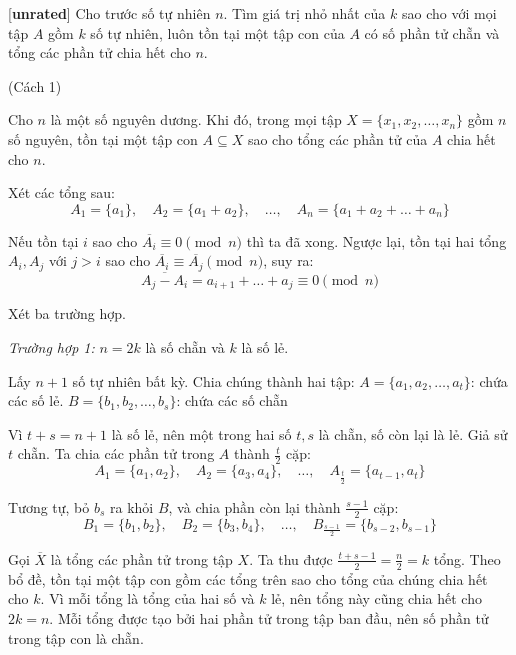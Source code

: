 \documentclass[../09-contruction-methods.tex]{subfiles}
\begin{document}
\begin{example*}\label{example:IRN-2015-TST-D2-P1}[\textbf{unrated}]
	Cho trước số tự nhiên \( n \). Tìm giá trị nhỏ nhất của \( k \) sao cho với mọi tập \( A \) gồm \( k \) số tự nhiên,
	luôn tồn tại một tập con của \( A \) có số phần tử chẵn và tổng các phần tử chia hết cho \( n \).
\end{example*}

\begin{soln}(Cách 1)\footnotemark
	\begin{claim*}
		Cho \( n \) là một số nguyên dương. Khi đó, trong mọi tập \( X = \{x_1, x_2, \dots, x_n\} \) gồm \( n \) số nguyên,
		tồn tại một tập con \( A \subseteq X \) sao cho tổng các phần tử của \( A \) chia hết cho \( n \).
	\end{claim*}
	\begin{subproof}
		Xét các tổng sau:
		\[
			A_1 = \{a_1\},\quad A_2 = \{a_1 + a_2\},\quad \dots,\quad A_n = \{a_1 + a_2 + \dots + a_n\}
		\]
		
		Nếu tồn tại \( i \) sao cho \( \overline{A_i} \equiv 0 \pmod{n} \) thì ta đã xong.
		Ngược lại, tồn tại hai tổng \( A_i, A_j \) với \( j > i \) sao cho \( \overline{A_i} \equiv \overline{A_j} \pmod{n} \), suy ra:
		\[
			\overline{A_j - A_i} = a_{i+1} + \dots + a_j \equiv 0 \pmod{n}
		\]
	\end{subproof}
	
	Xét ba trường hợp.

	\textit{Trường hợp 1:} \( n = 2k \) là số chẵn và \( k \) là số lẻ.

	Lấy \( n+1 \) số tự nhiên bất kỳ. Chia chúng thành hai tập: \( A = \{a_1, a_2, \dots, a_t\} \): chứa các số lẻ. \( B = \{b_1, b_2, \dots, b_s\} \): chứa các số chẵn
	
	Vì \( t + s = n + 1 \) là số lẻ, nên một trong hai số \( t, s \) là chẵn, số còn lại là lẻ. Giả sử \( t \) chẵn.
	Ta chia các phần tử trong \( A \) thành \( \frac{t}{2} \) cặp:
	\[
		A_1 = \{a_1, a_2\},\quad A_2 = \{a_3, a_4\},\quad \dots,\quad A_{\frac{t}{2}} = \{a_{t-1}, a_t\}
	\]
	
	Tương tự, bỏ \( b_s \) ra khỏi \( B \), và chia phần còn lại thành \( \frac{s - 1}{2} \) cặp:
	\[
		B_1 = \{b_1, b_2\},\quad B_2 = \{b_3, b_4\},\quad \dots,\quad B_{\frac{s - 1}{2}} = \{b_{s - 2}, b_{s - 1}\}
	\]
	
	Gọi \( \overline{X} \) là tổng các phần tử trong tập \( X \). Ta thu được \( \frac{t + s - 1}{2} = \frac{n}{2} = k \) tổng.
	Theo bổ đề, tồn tại một tập con gồm các tổng trên sao cho tổng của chúng chia hết cho \( k \).
	Vì mỗi tổng là tổng của hai số và \( k \) lẻ, nên tổng này cũng chia hết cho \( 2k = n \).
	Mỗi tổng được tạo bởi hai phần tử trong tập ban đầu, nên số phần tử trong tập con là chẵn.
	

\end{soln}
\end{document}
